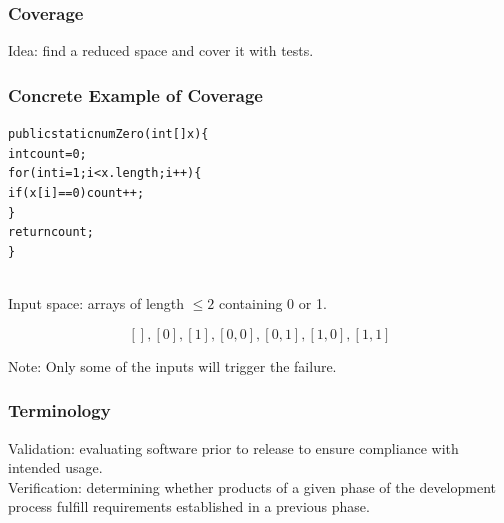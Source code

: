 \documentclass{beamer}
\newenvironment{changemargin}[1]{%
  \begin{list}{}{%
    \setlength{\topsep}{0pt}%
    \setlength{\leftmargin}{#1}%
    \setlength{\rightmargin}{1em}
    \setlength{\listparindent}{\parindent}%
    \setlength{\itemindent}{\parindent}%
    \setlength{\parsep}{\parskip}%
  }%
  \item[]}{\end{list}}
\begin{document}
\begin{frame}

  \frametitle{Coverage}

\large
  \begin{changemargin}{2em}
Idea: find a reduced space and cover it with tests.\\[1em]

  \end{changemargin}
  
\end{frame}

\begin{frame}

  \frametitle{Concrete Example of Coverage}

  \begin{changemargin}{2em}

\begin{alltt}
public static numZero(int[] x) \{ \\
\quad int count = 0; \\
\quad for (int i = 1; i < x.length; i++) \{ \\
\qquad if (x[i] == 0) count++; \\
\quad \} \\
\quad return count;\\
\}
\end{alltt}
~\\
Input space: arrays of length $\le 2$ containing 0 or 1.

\[ [], [0], [1], [0, 0], [0, 1], [1, 0], [1, 1] \]

Note: Only some of the inputs will trigger the failure.
  \end{changemargin}

\end{frame}

\begin{frame}

  \frametitle{Terminology}
  
  \begin{changemargin}{2em}
\alert{Validation}: evaluating software prior to release to 
ensure compliance with intended usage.\\[1em]

\alert{Verification}: determining whether products of a given phase
of the development process fulfill requirements established in a 
previous phase.
  \end{changemargin}

\end{frame}
\end{document}
